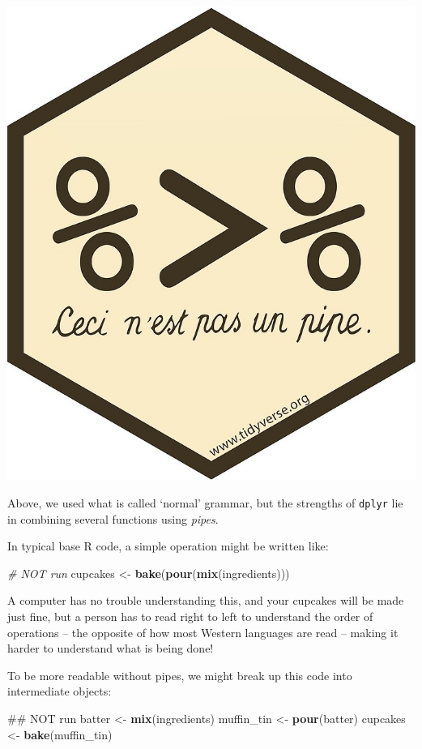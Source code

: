 \documentclass[]{book}
\newenvironment{Shaded}{\begin{snugshade}}{\end{snugshade}}
\newcommand{\KeywordTok}[1]{\textcolor[rgb]{0.13,0.29,0.53}{\textbf{#1}}}
\newcommand{\StringTok}[1]{\textcolor[rgb]{0.31,0.60,0.02}{#1}}
\newcommand{\CommentTok}[1]{\textcolor[rgb]{0.56,0.35,0.01}{\textit{#1}}}
\newcommand{\NormalTok}[1]{#1}
\begin{document}
\begin{center}\includegraphics[width=0.7\linewidth]{img/pipe} \end{center}

Above, we used what is called `normal' grammar, but the strengths of
\texttt{dplyr} lie in combining several functions using \emph{pipes}.

In typical base R code, a simple operation might be written like:

\begin{Shaded}
\begin{Highlighting}[]
\CommentTok{# NOT run}
\NormalTok{cupcakes <-}\StringTok{ }\KeywordTok{bake}\NormalTok{(}\KeywordTok{pour}\NormalTok{(}\KeywordTok{mix}\NormalTok{(ingredients)))}
\end{Highlighting}
\end{Shaded}

A computer has no trouble understanding this, and your cupcakes will be
made just fine, but a person has to read right to left to understand the
order of operations -- the opposite of how most Western languages are
read -- making it harder to understand what is being done!

To be more readable without pipes, we might break up this code into
intermediate objects:

\begin{Shaded}
\begin{Highlighting}[]
\NormalTok{## NOT run}
\NormalTok{batter <-}\StringTok{ }\KeywordTok{mix}\NormalTok{(ingredients)}
\NormalTok{muffin_tin <-}\StringTok{ }\KeywordTok{pour}\NormalTok{(batter)}
\NormalTok{cupcakes <-}\StringTok{ }\KeywordTok{bake}\NormalTok{(muffin_tin)}
\end{Highlighting}
\end{Shaded}
\end{document}
